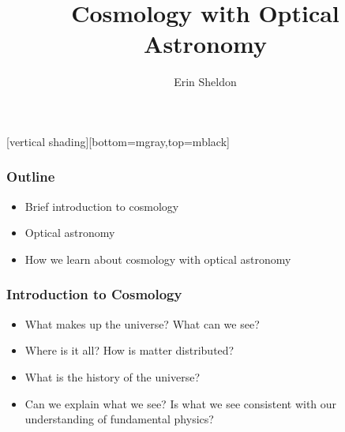 \documentclass{beamer}
\title{Cosmology with Optical Astronomy}
\author{Erin Sheldon}
\institute{Brookhaven National Laboratory}
\begin{document}
\frame
{
}
[vertical shading][bottom=mgray,top=mblack]



\frame{\titlepage}




\frame
{
    \frametitle{Outline}


    \begin{itemize}

        \item Brief introduction to cosmology
        \item Optical astronomy
        \item How we learn about cosmology with optical astronomy

    \end{itemize}

}

\frame
{
    \frametitle{Introduction to Cosmology}


    \begin{itemize}

        \item What makes up the universe? What can we see?

        \item Where is it all?  How is matter distributed?

        \item What is the history of the universe?

        \item Can we explain what we see?  Is what we see consistent with our
            understanding of fundamental physics?

    \end{itemize}

}
\end{document}
